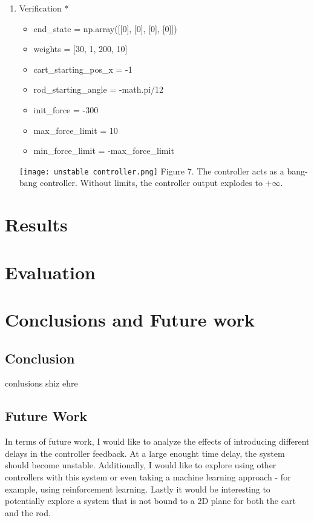 \documentclass{article}
\begin{document}
\begin{enumerate}
        
    \item Verification *
        \begin{itemize}
            \item end\_state = np.array([[0], [0], [0], [0]])
            \item weights = [30, 1, 200, 10]
            \item cart\_starting\_pos\_x = -1
            \item rod\_starting\_angle = -math.pi/12
            \item init\_force = -300
            \item max\_force\_limit = 10
            \item min\_force\_limit = -max\_force\_limit
        \end{itemize}
        \begin{center}
            \texttt{[image: unstable controller.png]}
            Figure 7. The controller acts as a bang-bang controller. Without limits, the controller output explodes to +$\infty$.
        \end{center}

\end{enumerate}


\section{Results}


\section{Evaluation}


\section{Conclusions and Future work}
\subsection{Conclusion}

conlusions shiz ehre

\subsection{Future Work}
In terms of future work, I would like to analyze the effects of introducing different delays in the controller feedback. At a large enought time delay, the system should become unstable. Additionally, I would like to explore using other controllers with this system or even taking a machine learning approach - for example, using reinforcement learning. Lastly it would be interesting to potentially explore a system that is not bound to a 2D plane for both the cart and the rod.
\end{document}
